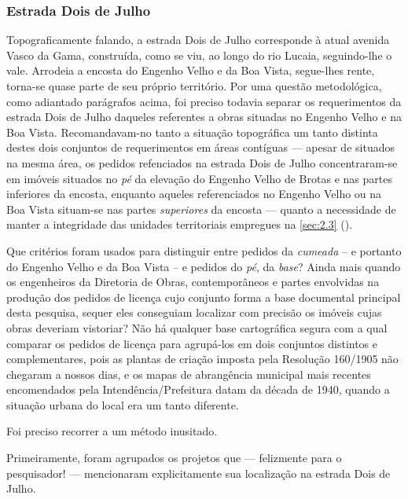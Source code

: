 \subsubsection{Estrada Dois de Julho}


Topograficamente falando, a estrada Dois de Julho corresponde à atual avenida Vasco da Gama, construída, como se viu, ao longo do rio Lucaia, seguindo-lhe o vale. Arrodeia a encosta do Engenho Velho e da Boa Vista, segue-lhes rente, torna-se quase parte de seu próprio território.  Por uma questão metodológica, como adiantado parágrafos acima, foi preciso todavia separar os requerimentos da estrada Dois de Julho daqueles referentes a obras situadas no Engenho Velho e na Boa Vista. Recomandavam-no tanto a situação topográfica um tanto distinta destes dois conjuntos de requerimentos em áreas contíguas --- apesar de situados na mesma área, os pedidos refenciados na estrada Dois de Julho concentraram-se em imóveis situados no \textit{pé} da elevação do Engenho Velho de Brotas e nas partes inferiores da encosta, enquanto aqueles referenciados no Engenho Velho ou na Boa Vista situam-se nas partes \textit{superiores} da encosta --- quanto a necessidade de manter a integridade das unidades territoriais empregues na \autoref{sec:2.3} (\pageref{sec:2.3}).

Que critérios foram usados para distinguir entre pedidos da \textit{cumeada} -- e portanto do Engenho Velho e da Boa Vista -- e pedidos do \textit{pé}, da \textit{base}? Ainda mais quando os engenheiros da Diretoria de Obras, contemporâneos e partes envolvidas na produção dos pedidos de licença cujo conjunto forma a base documental principal desta pesquisa, sequer eles conseguiam localizar com precisão os imóveis cujas obras deveriam vistoriar? Não há qualquer base cartográfica segura com a qual comparar os pedidos de licença para agrupá-los em dois conjuntos distintos e complementares, pois as plantas de criação imposta pela Resolução 160/1905 não chegaram a nossos dias, e os mapas de abrangência municipal mais recentes encomendados pela Intendência/Prefeitura datam da década de 1940, quando a situação urbana do local era um tanto diferente. 

Foi preciso recorrer a um método inusitado. 

Primeiramente, foram agrupados os projetos que --- felizmente para o pesquisador! --- mencionaram explicitamente sua localização na estrada Dois de Julho. 

